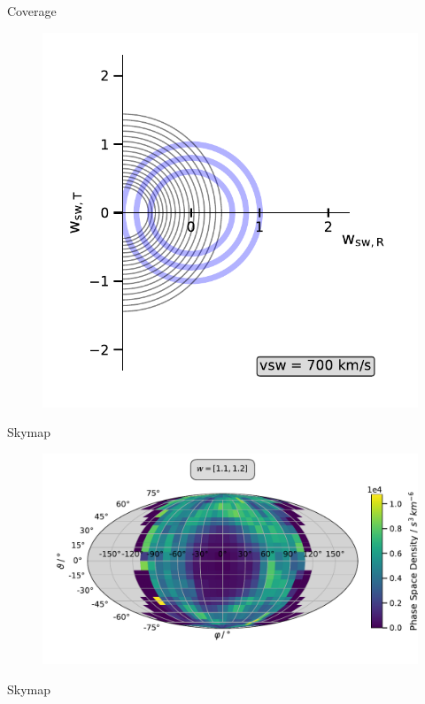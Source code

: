 \documentclass{beamer}
\begin{document}
\begin{frame}{Coverage}
	\begin{figure}
	\includegraphics[scale=.45]{Pics/cov.pdf}
\end{figure}
\end{frame}


\begin{frame}{Skymap}
	\begin{figure}
	\includegraphics[scale=.45]{Pics/ps_sky.pdf}
\end{figure}
\end{frame}


\begin{frame}{Skymap}

\end{frame}
\end{document}
